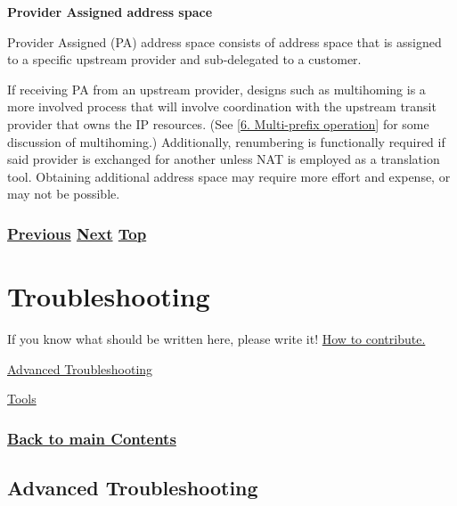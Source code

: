 \documentclass[
]{article}
\begin{document}
\textbf{Provider Assigned address space}

Provider Assigned (PA) address space consists of address space that is
assigned to a specific upstream provider and sub-delegated to a
customer.

If receiving PA from an upstream provider, designs such as multihoming
is a more involved process that will involve coordination with the
upstream transit provider that owns the IP resources. (See
{[}\hyperref[multi-prefix-operation]{6. Multi-prefix operation}{]} for
some discussion of multihoming.) Additionally, renumbering is
functionally required if said provider is exchanged for another unless
NAT is employed as a translation tool. Obtaining additional address
space may require more effort and expense, or may not be possible.

\subsubsection{\texorpdfstring{\hyperref[deployment-in-the-home]{Previous}
\hyperref[troubleshooting]{Next}
\hyperref[deployment-status]{Top}}{Previous Next Top}}\label{previous-next-top-37}

\pagebreak

\section{Troubleshooting}\label{troubleshooting}

If you know what should be written here, please write it!
\href{https://github.com/becarpenter/book6/blob/main/1.\%20Introduction\%20and\%20Foreword/How\%20to\%20contribute.md\#how-to-contribute}{How
to contribute.}

\hyperref[advanced-troubleshooting]{Advanced Troubleshooting}

\hyperref[tools]{Tools}

\subsubsection{\texorpdfstring{\hyperref[list-of-contents]{Back to main
Contents}}{Back to main Contents}}\label{back-to-main-contents-8}

\pagebreak

\subsection{Advanced Troubleshooting}\label{advanced-troubleshooting}
\end{document}
